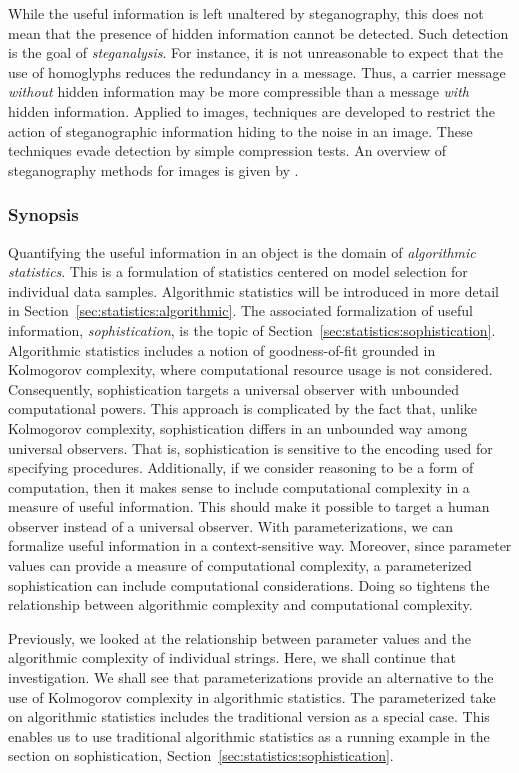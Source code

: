 While the useful information is left unaltered by steganography, this does not mean that the presence of hidden information cannot be detected.
Such detection is the goal of \emph{steganalysis}.
For instance, it is not unreasonable to expect that the use of homoglyphs reduces the redundancy in a message.
Thus, a carrier message \emph{without} hidden information may be more compressible than a message \emph{with} hidden information.
Applied to images, techniques are developed to restrict the action of steganographic information hiding to the noise in an image.
These techniques evade detection by simple compression tests.
An overview of steganography methods for images is given by \textcite{cheddad2010digital}.

\subsubsection{Synopsis}
Quantifying the useful information in an object is the domain of \emph{algorithmic statistics}.
This is a formulation of statistics centered on model selection for individual data samples.
Algorithmic statistics will be introduced in more detail in Section~\ref{sec:statistics:algorithmic}.
The associated formalization of useful information, \emph{sophistication}, is the topic of Section~\ref{sec:statistics:sophistication}.
Algorithmic statistics includes a notion of goodness-of-fit grounded in Kolmogorov complexity, where computational resource usage is not considered.
Consequently, sophistication targets a universal observer with unbounded computational powers.
This approach is complicated by the fact that, unlike Kolmogorov complexity, sophistication differs in an unbounded way among universal observers.
That is, sophistication is sensitive to the encoding used for specifying procedures.
Additionally, if we consider reasoning to be a form of computation, then it makes sense to include computational complexity in a measure of useful information.
This should make it possible to target a human observer instead of a universal observer.
With parameterizations, we can formalize useful information in a context-sensitive way.
Moreover, since parameter values can provide a measure of computational complexity, a parameterized sophistication can include computational considerations.
Doing so tightens the relationship between algorithmic complexity and computational complexity.

Previously, we looked at the relationship between parameter values and the algorithmic complexity of individual strings.
Here, we shall continue that investigation.
We shall see that parameterizations provide an alternative to the use of Kolmogorov complexity in algorithmic statistics.
The parameterized take on algorithmic statistics includes the traditional version as a special case.
This enables us to use traditional algorithmic statistics as a running example in the section on sophistication, Section~\ref{sec:statistics:sophistication}.

